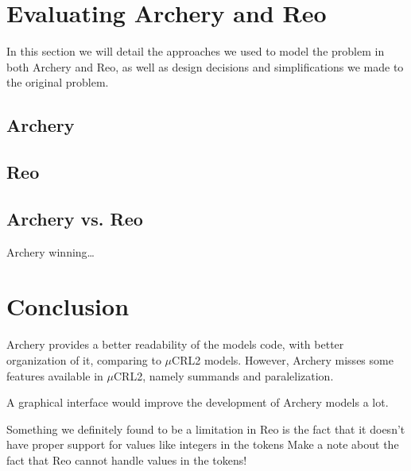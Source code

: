 \documentclass[a4paper]{article}
\newcommand{\ar}{Archery\xspace}
\newcommand{\re}{Reo\xspace}
\newcommand{\mcrl}{$\mu$CRL2\xspace}
\begin{document}


%
%
\section{Evaluating \ar and \re}

In this section we will detail the approaches we used to model the problem in
both \ar and \re, as well as design decisions and simplifications we made to the
original problem.



\subsection{\ar}


\subsection{\re}


\subsection{\ar vs. \re}

\ar winning\dots

%
%
\section{Conclusion}
\ar provides a better readability of the models code, with better organization
of it, comparing to \mcrl models. However, \ar misses some features available in
\mcrl, namely summands and paralelization.

A graphical interface would improve the development of Archery models a lot.



Something we definitely found to be a limitation in \re is the fact that it
doesn't have proper support for values like integers in the tokens
Make a note about the fact that \re cannot handle values in the tokens! %
\end{document}
